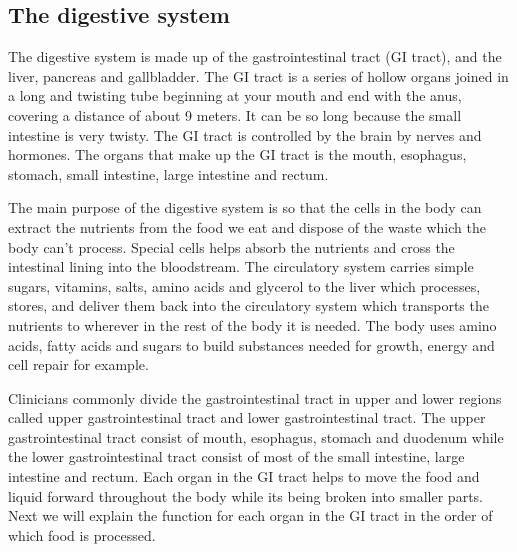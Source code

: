 \documentclass[thesis.tex]{subfiles}
\begin{document}
\subsection{The digestive system}  \label{sec:the_digestive_system}

The digestive system is made up of the gastrointestinal tract (GI tract), and the liver, pancreas and gallbladder. The GI tract is a series of hollow organs joined in a long and twisting tube beginning at your mouth and end with the anus, covering a distance of about 9 meters. It can be so long because the small intestine is very twisty. The GI tract is controlled by the brain by nerves and hormones. The organs that make up the GI tract is the mouth, esophagus, stomach, small intestine, large intestine and rectum.

The main purpose of the digestive system is so that the cells in the body can extract the nutrients from the food we eat and dispose of the waste which the body can't process. Special cells helps absorb the nutrients and cross the intestinal lining into the bloodstream. The circulatory system carries simple sugars, vitamins, salts, amino acids and glycerol to the liver which processes, stores, and deliver them back into the circulatory system which transports the nutrients to wherever in the rest of the body it is needed. The body uses amino acids, fatty acids and sugars to build substances needed for growth, energy and cell repair for example. 

Clinicians commonly divide the gastrointestinal tract in upper and lower regions called upper gastrointestinal tract and lower gastrointestinal tract. The upper gastrointestinal tract consist of mouth, esophagus, stomach and duodenum while the lower gastrointestinal tract consist of most of the small intestine, large intestine and rectum. Each organ in the GI tract helps to move the food and liquid forward throughout the body while its being broken into smaller parts. Next we will explain the function for each organ in the GI tract in the order of which food is processed.
\end{document}
